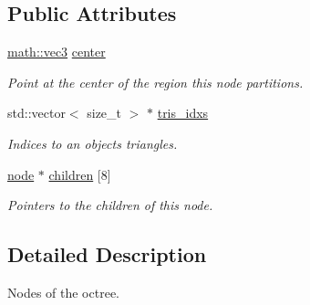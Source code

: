 \subsection*{Public Attributes}
\begin{DoxyCompactItemize}
\item 
\mbox{\label{structphysim_1_1structures_1_1object__partition_1_1node_ae535e618078fd71a060df825e9f3a7ae}} 
\hyperlink{structphysim_1_1math_1_1vec3}{math\+::vec3} \hyperlink{structphysim_1_1structures_1_1object__partition_1_1node_ae535e618078fd71a060df825e9f3a7ae}{center}
\begin{DoxyCompactList}\small\item\em Point at the center of the region this node partitions. \end{DoxyCompactList}\item 
\mbox{\label{structphysim_1_1structures_1_1object__partition_1_1node_a73ec613764b8eb7a893ad368b060258b}} 
std\+::vector$<$ size\+\_\+t $>$ $\ast$ \hyperlink{structphysim_1_1structures_1_1object__partition_1_1node_a73ec613764b8eb7a893ad368b060258b}{tris\+\_\+idxs}
\begin{DoxyCompactList}\small\item\em Indices to an object\textquotesingle{}s triangles. \end{DoxyCompactList}\item 
\mbox{\label{structphysim_1_1structures_1_1object__partition_1_1node_a27aee2b688559600ce40bfc4b7cf3625}} 
\hyperlink{structphysim_1_1structures_1_1object__partition_1_1node}{node} $\ast$ \hyperlink{structphysim_1_1structures_1_1object__partition_1_1node_a27aee2b688559600ce40bfc4b7cf3625}{children} \mbox{[}8\mbox{]}
\begin{DoxyCompactList}\small\item\em Pointers to the children of this node. \end{DoxyCompactList}\end{DoxyCompactItemize}


\subsection{Detailed Description}
Nodes of the octree. 

